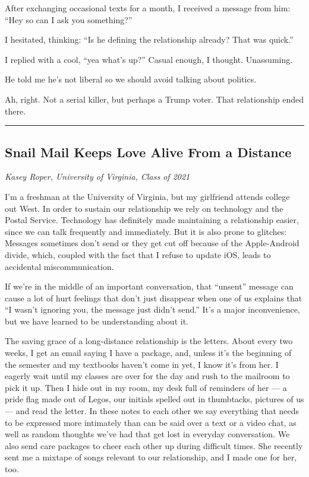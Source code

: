 After exchanging occasional texts for a month, I received a message from
him: ``Hey so can I ask you something?''

I hesitated, thinking: ``Is he defining the relationship already? That
was quick.''

I replied with a cool, ``yea what's up?'' Casual enough, I thought.
Unassuming.

He told me he's not liberal so we should avoid talking about politics.

Ah, right. Not a serial killer, but perhaps a Trump voter. That
relationship ended there.

\begin{center}\rule{0.5\linewidth}{\linethickness}\end{center}

\hypertarget{snail-mail-keeps-love-alive-from-a-distance}{%
\subsection{Snail Mail Keeps Love Alive From a
Distance}\label{snail-mail-keeps-love-alive-from-a-distance}}

\emph{Kasey Roper, University of Virginia, Class of 2021}

I'm a freshman at the University of Virginia, but my girlfriend attends
college out West. In order to sustain our relationship we rely on
technology and the Postal Service. Technology has definitely made
maintaining a relationship easier, since we can talk frequently and
immediately. But it is also prone to glitches: Messages sometimes don't
send or they get cut off because of the Apple-Android divide, which,
coupled with the fact that I refuse to update iOS, leads to accidental
miscommunication.

If we're in the middle of an important conversation, that ``unsent''
message can cause a lot of hurt feelings that don't just disappear when
one of us explains that ``I wasn't ignoring you, the message just didn't
send.'' It's a major inconvenience, but we have learned to be
understanding about it.

The saving grace of a long-distance relationship is the letters. About
every two weeks, I get an email saying I have a package, and, unless
it's the beginning of the semester and my textbooks haven't come in yet,
I know it's from her. I eagerly wait until my classes are over for the
day and rush to the mailroom to pick it up. Then I hide out in my room,
my desk full of reminders of her --- a pride flag made out of Legos, our
initials spelled out in thumbtacks, pictures of us --- and read the
letter. In these notes to each other we say everything that needs to be
expressed more intimately than can be said over a text or a video chat,
as well as random thoughts we've had that get lost in everyday
conversation. We also send care packages to cheer each other up during
difficult times. She recently sent me a mixtape of songs relevant to our
relationship, and I made one for her, too.

